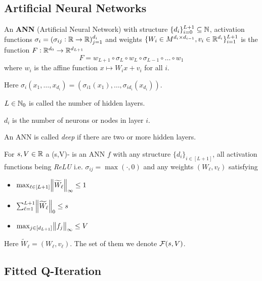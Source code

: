 \subsection{Artificial Neural Networks}

\begin{defn}\label{def_ANN}
	An \textbf{ANN} (Artificial Neural Network) with structure
	$\{ d_i \}_{i=0}^{L+1} \subseteq \mathbb{N}$,
	activation functions $\sigma_i = (\sigma_{ij} : \mathbb{R} \to \mathbb{R})_{j=1}^{d_i}$
	and weights $\{ W_i \in M^{d_i \times d_{i-1}}, v_i \in \mathbb{R}^{d_i} \}_{i=1}^{L+1}$
	is the function $F:\mathbb{R}^{d_0} \to \mathbb{R}^{d_{L+1}}$ 
	\[ F = w_{L+1} \circ \sigma_L \circ w_L \circ \sigma_{L-1} \circ \dots \circ w_1 \]
	where $w_i$ is the affine function $x \mapsto W_i x + v_i$ for all $i$.

	Here $\sigma_i(x_1, \dots, x_{d_i})
	= (\sigma_{i1}(x_1), \dots, \sigma_{id_{i}}(x_{d_{i}}))$.

	$L \in \mathbb{N}_0$ is called the number of hidden layers.

	$d_i$ is the number of neurons or nodes in layer $i$.
\end{defn}

An ANN is called \emph{deep} if there are two or more hidden layers.

\begin{defn}
  For $s,V \in \mathbb{R}$ a (s,V)- is an ANN $f$
  with any structure $\{d_i\}_{i\in [L+1]}$,
  all activation functions being \emph{ReLU} i.e. $\sigma_{ij} = \max(\cdot, 0)$
  and any weights $(W_\ell, v_\ell)$
  satisfying
  \begin{multicols}{3}
    \begin{itemize}
      \item $\max_{\ell \in [L+1]} \norm{\widetilde{W}_\ell}_\infty \leq 1$
      \item $\sum_{\ell = 1}^{L+1} \norm{\widetilde{W}_\ell}_0 \leq s$
      \item $\max_{j \in [d_{L+1}]} \norm{f_j}_\infty \leq V$
    \end{itemize}
  \end{multicols}
  Here $\widetilde{W}_\ell = (W_\ell, v_\ell)$.
  The set of them we denote $\mathcal{F}(s,V)$.
\end{defn}

\subsection{Fitted Q-Iteration}

